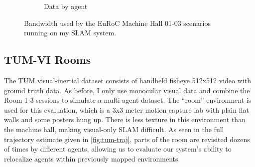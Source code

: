 \begin{figure}[h]
\begin{subfigure}[b]{0.45\linewidth}
        \caption{Data by agent}
    \end{subfigure}%

    \caption{Bandwidth used by the EuRoC Machine Hall 01-03 scenarios running on my SLAM system.}
    \label{fig:euroc-mh-01-02-bandwith}
\end{figure}


\subsection{TUM-VI Rooms}
\label{sec:tum-rooms}
The TUM visual-inertial dataset \autocite{8593419} consists of handheld fisheye 512x512 video with ground truth data. As before, I only use monocular visual data and combine the Room 1-3 sessions to simulate a multi-agent dataset. The ``room'' environment is used for this evaluation, which is a 3x3 meter motion capture lab with plain flat walls and some posters hung up. There is less texture in this environment than the machine hall, making visual-only SLAM difficult. As seen in the full trajectory estimate given in \autoref{fig:tum-traj}, parts of the room are revisited dozens of times by different agents, allowing us to evaluate our system's ability to relocalize agents within previously mapped environments.

